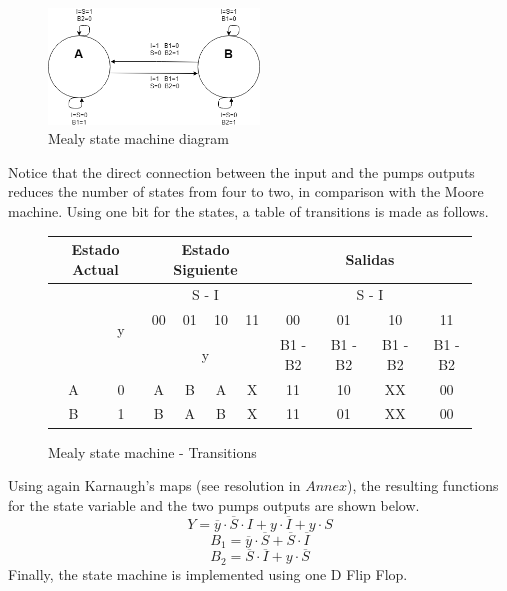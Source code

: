 \begin{figure}[H]
    \begin{centering}
    \includegraphics[width=0.5\textwidth]{data/Graficos1/1b_fsm.png}
    \par\end{centering}
    \caption{Mealy state machine diagram}
\end{figure}

Notice that the direct connection between the 
input and the pumps outputs reduces the number 
of states from four to two, in comparison with 
the Moore machine.
Using one bit for the states, a table of transitions
is made as follows.

\begin{figure}[H]
\begin{centering}
\begin{tabular}{|c|c|c|c|c|c||c|c|c|c|}
    \hline 
    \multicolumn{2}{|c|}{Estado Actual} & \multicolumn{4}{c||}{Estado Siguiente} & \multicolumn{4}{c|}{Salidas}\tabularnewline
    \hline 
    \hline 
    \multirow{3}{*}{} & \multirow{3}{*}{y} & \multicolumn{4}{c||}{S - I} & \multicolumn{4}{c|}{S - I}\tabularnewline
    \cline{3-10} 
     &  & 00 & 01 & 10 & 11 & 00 & 01 & 10 & 11\tabularnewline
    \cline{3-10} 
     &  & \multicolumn{4}{c||}{y} & B1 - B2 & B1 - B2 & B1 - B2 & B1 - B2\tabularnewline
    \hline 
    A & 0 & A & B & A & X & 11 & 10 & XX & 00\tabularnewline
    \hline 
    B & 1 & B & A & B & X & 11 & 01 & XX & 00\tabularnewline
    \hline 
    \end{tabular}
    \caption{Mealy state machine - Transitions}
\end{centering}
\end{figure}

Using again Karnaugh's maps (see resolution in $Annex$), the resulting functions for
the state variable and the two pumps outputs are shown below.
$$Y = \overline{y} \cdot \overline{S} \cdot I + y \cdot \overline{I} + y \cdot S$$ 
$$B_1 = \overline{y} \cdot \overline{S} + \overline{S} \cdot \overline{I}$$
$$B_2 = \overline{S} \cdot \overline{I} + y \cdot \overline{S}$$
Finally, the state machine is implemented using
one D Flip Flop.

